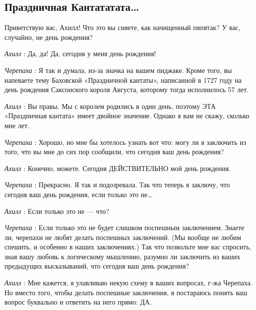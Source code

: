 \documentclass[../main.tex]{subfiles}
\begin{document}
\subsection{Праздничная Кантататата\ldots{}}


\begin{dialogue}

 Приветствую вас, Ахилл! Что это вы сияете, как начищенный пяпятак? У вас, случайно, не день рождения?

\emph{Ахилл} : Да, да! Да, сегодня у меня день рождения!

\emph{Черепаха} : Я так и думала, из-за значка на вашем пиджаке. Кроме того, вы напеваете тему Баховской «Праздничной кантаты», написанной в 1727 году на день рождения Саксонского короля Августа, которому тогда исполнилось 57 лет.

\emph{Ахилл} : Вы правы. Мы с королем родились в один день, поэтому ЭТА «Праздничная кантата» имеет двойное значение. Однако я вам не скажу, сколько мне лет.

\emph{Черепаха} : Хорошо, но мне бы хотелось узнать вот что: могу ли я заключить из того, что вы мне до сих пор сообщили, что сегодня ваш день рождения?

\emph{Ахилл} : Конечно, можете. Сегодня ДЕЙСТВИТЕЛЬНО мой день рождения.

\emph{Черепаха} : Прекрасно. Я так и подозревала. Так что теперь я заключу, что сегодня ваш день рождения, если только это не\ldots{}

\emph{Ахилл} : Если только это не --- что?

\emph{Черепаха} : Если только это не будет слишком поспешным заключением. Знаете ли, черепахи не любят делать поспешных заключений. (Мы вообще не любим спешить, и особенно в наших заключениях.) Так что позвольте мне вас спросить, зная вашу любовь к логическому мышлению, разумно ли заключить из ваших предыдущих высказываний, что сегодня ваш день рождения?

\emph{Ахилл} : Мне кажется, я улавливаю некую схему в ваших вопросах, г-жа Черепаха. Но вместо того, чтобы делать поспешные заключения, я постараюсь понять ваш вопрос буквально и ответить на него прямо: ДА.


\end{dialogue}
\end{document}
